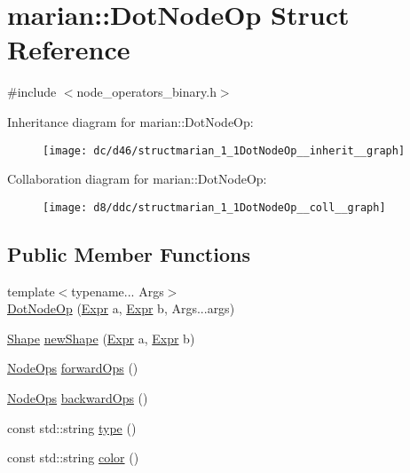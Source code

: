 \hypertarget{structmarian_1_1DotNodeOp}{}\section{marian\+:\+:Dot\+Node\+Op Struct Reference}
\label{structmarian_1_1DotNodeOp}


{\ttfamily \#include $<$node\+\_\+operators\+\_\+binary.\+h$>$}



Inheritance diagram for marian\+:\+:Dot\+Node\+Op\+:
\nopagebreak
\begin{figure}[H]
\begin{center}
\leavevmode
\texttt{[image: dc/d46/structmarian\_1\_1DotNodeOp\_\_inherit\_\_graph]}
\end{center}
\end{figure}


Collaboration diagram for marian\+:\+:Dot\+Node\+Op\+:
\nopagebreak
\begin{figure}[H]
\begin{center}
\leavevmode
\texttt{[image: d8/ddc/structmarian\_1\_1DotNodeOp\_\_coll\_\_graph]}
\end{center}
\end{figure}
\subsection*{Public Member Functions}
\begin{DoxyCompactItemize}
\item 
{\footnotesize template$<$typename... Args$>$ }\\\hyperlink{structmarian_1_1DotNodeOp_a66d1926cfedd0f890967b6d0fc618ab8}{Dot\+Node\+Op} (\hyperlink{namespacemarian_a498d8baf75b754011078b890b39c8e12}{Expr} a, \hyperlink{namespacemarian_a498d8baf75b754011078b890b39c8e12}{Expr} b, Args...\+args)
\item 
\hyperlink{structmarian_1_1Shape}{Shape} \hyperlink{structmarian_1_1DotNodeOp_ad897baac4270ce0d87fd90d340609e52}{new\+Shape} (\hyperlink{namespacemarian_a498d8baf75b754011078b890b39c8e12}{Expr} a, \hyperlink{namespacemarian_a498d8baf75b754011078b890b39c8e12}{Expr} b)
\item 
\hyperlink{namespacemarian_a4956376218cc236016c20bc4071470da}{Node\+Ops} \hyperlink{structmarian_1_1DotNodeOp_a72a5f5125f26d022b23630dc90ea5c2d}{forward\+Ops} ()
\item 
\hyperlink{namespacemarian_a4956376218cc236016c20bc4071470da}{Node\+Ops} \hyperlink{structmarian_1_1DotNodeOp_a015697830536478b4b8226c7e963dd3a}{backward\+Ops} ()
\item 
const std\+::string \hyperlink{structmarian_1_1DotNodeOp_a26ba9e725a0220dd11201529bb8edbfb}{type} ()
\item 
const std\+::string \hyperlink{structmarian_1_1DotNodeOp_aab065629807f2abbe28a61fa1f800c63}{color} ()
\end{DoxyCompactItemize}
